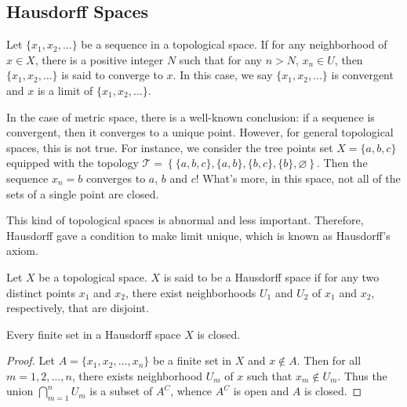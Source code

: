 \subsection{Hausdorff Spaces}
\begin{defn}
Let $\{x_1, x_2, \ldots\}$ be a sequence in a topological space. 
If for any neighborhood of $x \in X$, there is a positive integer $N$ such 
that for any $n > N$, $x_n \in U$, then $\{x_1, x_2, \ldots\}$ is said to 
converge to $x$. 
In this case, we say $\{x_1, x_2, \ldots\}$ is convergent and $x$ is a limit 
of $\{x_1, x_2, \ldots\}$. 
\end{defn}
In the case of metric space, there is a well-known conclusion: 
if a sequence is convergent, then it converges to a unique point. 
However, for general topological spaces, this is not true. 
For instance, we consider the tree points set $X = \{a, b, c\}$ equipped 
with the topology $\mathcal{T} = \left\{\{a, b, c\}, \{a, b\}, \{b, c\}, 
\{b\}, \varnothing \right\}$. 
Then the sequence $x_n = b$ converges to $a$, $b$ and $c$!
What's more, in this space, not all of the sets of a single point are 
closed. 

This kind of topological spaces is abnormal and less important. 
Therefore, Hausdorff gave a condition to make limit unique, which is 
known as Hausdorff's axiom. 
\begin{defn}
Let $X$ be a topological space. 
$X$ is said to be a Hausdorff space if for any two distinct points $x_1$ and 
$x_2$, there exist neighborhoods $U_1$ and $U_2$ of $x_1$ and $x_2$, 
respectively, that are disjoint. 
\end{defn}

\begin{thm}
Every finite set in a Hausdorff space $X$ is closed. 
\end{thm}
\begin{proof}
Let $A = \{x_1, x_2, \ldots, x_n\}$ be a finite set in $X$ and $x \notin A$. 
Then for all $m = 1, 2, \ldots, n$, there exists neighborhood $U_m$ of $x$ 
such that $x_m \notin U_m$. 
Thus the union $\bigcap_{m=1}^n U_m$ is a subset of $A^C$, whence 
$A^C$ is open and $A$ is closed. 
\end{proof}

